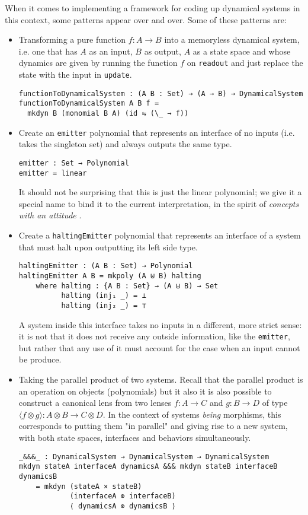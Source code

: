 When it comes to implementing a framework for coding up dynamical systems in this context, some patterns appear over and over. Some of these patterns are: 
\begin{itemize}
    \item Transforming a pure function $f : A \rightarrow B$ into a memoryless dynamical system, i.e. one that has $A$ as an input, $B$ as output, $A$ as a state space and whose dynamics are given by running the function $f$ on \texttt{readout} and just replace the state with the input in \texttt{update}.

        \begin{verbatim}
functionToDynamicalSystem : (A B : Set) → (A → B) → DynamicalSystem
functionToDynamicalSystem A B f = 
  mkdyn B (monomial B A) (id ⇆ (\_ → f))
\end{verbatim}
    \item Create an \texttt{emitter} polynomial that represents an interface of no inputs (i.e. takes the singleton set) and always outputs the same type.
        \begin{verbatim}
emitter : Set → Polynomial
emitter = linear
\end{verbatim}
    It should not be surprising that this is just the linear polynomial; we give it a special name to bind it to the current interpretation, in the spirit of \textit{concepts with an attitude} \cite{conceptwithattitude}.
    \item Create a \texttt{haltingEmitter} polynomial that represents an interface of a system that must halt upon outputting its left side type.
        \begin{verbatim}
haltingEmitter : (A B : Set) → Polynomial
haltingEmitter A B = mkpoly (A ⊎ B) halting
    where halting : {A B : Set} → (A ⊎ B) → Set
          halting (inj₁ _) = ⊥
          halting (inj₂ _) = ⊤
\end{verbatim}
    A system inside this interface takes no inputs in a different, more strict sense: it is not that it does not receive any outside information, like the \texttt{emitter}, but rather that any use of it must account for the case when an input cannot be produce.
    \item Taking the parallel product of two systems. Recall that the parallel product is an operation on objects (polynomials) but it also it is also possible to construct a canonical lens from two lenses $f : A \rightarrow C$ and $g : B \rightarrow D$ of type $\langle f \otimes g \rangle : A \otimes B \rightarrow C \otimes D$. In the context of systems \textit{being} morphisms, this corresponds to putting them "in parallel" and giving rise to a new system, with both state spaces, interfaces and behaviors simultaneously.
    \begin{verbatim}
_&&&_ : DynamicalSystem → DynamicalSystem → DynamicalSystem
mkdyn stateA interfaceA dynamicsA &&& mkdyn stateB interfaceB dynamicsB 
    = mkdyn (stateA × stateB)
            (interfaceA ⊗ interfaceB) 
            ⟨ dynamicsA ⊗ dynamicsB ⟩


\end{verbatim}
\end{itemize}
